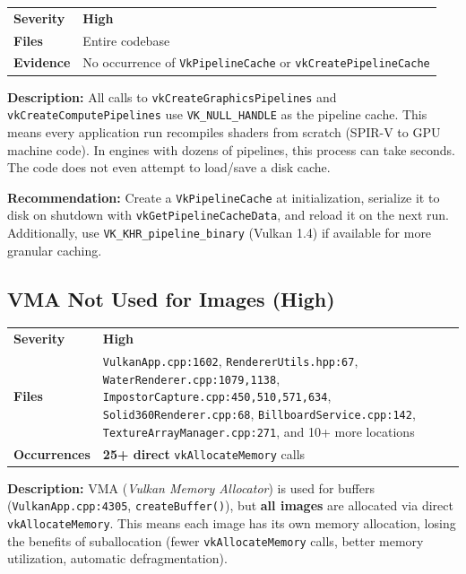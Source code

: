 \documentclass[a4paper,10pt]{article}
\newcommand{\severity}[1]{%
  \ifstrequal{#1}{Critical}{\textcolor{high}{\textbf{#1}}}{%
  \ifstrequal{#1}{High}{\textcolor{high}{\textbf{#1}}}{%
  \ifstrequal{#1}{Medium}{\textcolor{medium}{\textbf{#1}}}{%
  \ifstrequal{#1}{Low}{\textcolor{low}{\textbf{#1}}}{#1}}}}}
\begin{document}
\begin{tabular}{ll}
    \textbf{Severity} & \severity{High} \\
    \textbf{Files}     & Entire codebase \\
    \textbf{Evidence} & No occurrence of \texttt{VkPipelineCache} or
                          \texttt{vkCreatePipelineCache} \\
\end{tabular}

\vspace{0.5em}
\noindent
\textbf{Description:} All calls to \texttt{vkCreateGraphicsPipelines} and
\texttt{vkCreateComputePipelines} use \texttt{VK\_NULL\_HANDLE} as the
pipeline cache. This means every application run recompiles shaders from scratch
(SPIR-V to GPU machine code). In engines with dozens of pipelines, this process
can take seconds. The code does not even attempt to load/save a disk cache.

\noindent\textbf{Recommendation:} Create a \texttt{VkPipelineCache} at
initialization, serialize it to disk on shutdown with
\texttt{vkGetPipelineCacheData}, and reload it on the next run.
Additionally, use \texttt{VK\_KHR\_pipeline\_binary} (Vulkan 1.4) if
available for more granular caching.

\subsection{VMA Not Used for Images (High)}

\begin{tabular}{ll}
    \textbf{Severity} & \severity{High} \\
    \textbf{Files}     & \texttt{VulkanApp.cpp:1602},
                          \texttt{RendererUtils.hpp:67},
                          \texttt{WaterRenderer.cpp:1079,1138},
                          \texttt{ImpostorCapture.cpp:450,510,571,634},
                          \texttt{Solid360Renderer.cpp:68},
                          \texttt{BillboardService.cpp:142},
                          \texttt{TextureArrayManager.cpp:271},
                          and 10+ more locations \\
    \textbf{Occurrences}& \textbf{25+ direct} \texttt{vkAllocateMemory} calls \\
\end{tabular}

\vspace{0.5em}
\noindent
\textbf{Description:} VMA (\textit{Vulkan Memory Allocator}) is used for
buffers (\texttt{VulkanApp.cpp:4305}, \texttt{createBuffer()}), but
\textbf{all images} are allocated via direct \texttt{vkAllocateMemory}.
This means each image has its own memory allocation, losing the benefits of
suballocation (fewer \texttt{vkAllocateMemory} calls, better memory utilization,
automatic defragmentation).
\end{document}
